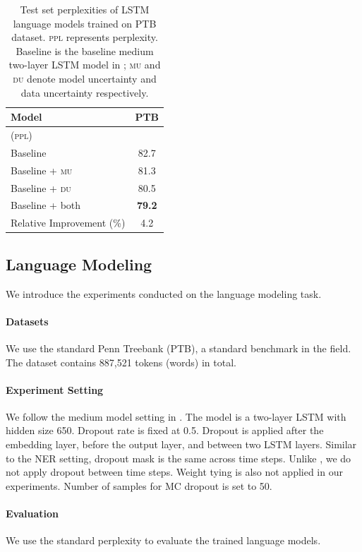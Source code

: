 \documentclass[letterpaper]{article} %
\begin{document}
\begin{table}[t!]
\begin{center}
\begin{tabular}{lc}
\hline
{\bf Model} & {\bf PTB}\\  \hline
(\textsc{ppl}) \\
Baseline & 82.7 \\
Baseline + \textsc{mu} & 81.3\\
Baseline + \textsc{du} & 80.5 \\
Baseline + both        & \bf 79.2 \\ \hline
Relative Improvement (\%) & 4.2 \\
\hline
\end{tabular}
\end{center}
\caption{\label{tab:lm_results}Test set perplexities of LSTM language models trained on PTB dataset. \textsc{ppl} represents perplexity. Baseline is the baseline medium two-layer LSTM model in \cite{zaremba2014recurrent}; \textsc{mu} and \textsc{du} denote model uncertainty and data uncertainty respectively.}
\end{table}

\subsection{Language Modeling}
We introduce the experiments conducted on the language modeling task.

\paragraph{Datasets} We use the standard Penn Treebank (PTB), a standard benchmark in the field. The dataset contains 887,521 tokens (words) in total.

\paragraph{Experiment Setting} We follow the medium model setting in \cite{zaremba2014recurrent}. The model is a two-layer LSTM with hidden size 650. Dropout rate is fixed at 0.5. Dropout is applied after the embedding layer, before the output layer, and between two LSTM layers. Similar to the NER setting, dropout mask is the same across time steps. Unlike \cite{gal2016theoretically}, we do not apply dropout between time steps. Weight tying is also not applied in our experiments. Number of samples for MC dropout is set to 50.

\paragraph{Evaluation} We use the standard perplexity to evaluate the trained language models.
\end{document}
